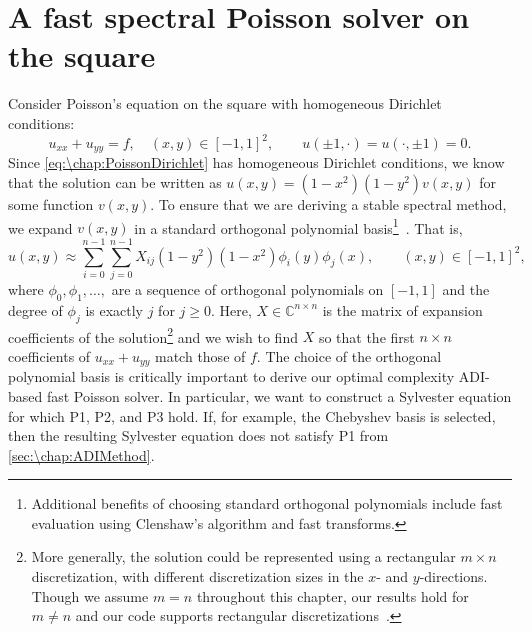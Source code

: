 \section{A fast spectral Poisson solver on the square}\label{sec:\chap:PoissonSquare}
Consider Poisson's equa\-tion on the square with homogeneous Dirichlet conditions:
\begin{equation}
u_{xx} + u_{yy} = f, \quad (x,y)\in[-1,1]^2, \qquad u(\pm1,\cdot) = u(\cdot,\pm 1) = 0.
\label{eq:\chap:PoissonDirichlet}
\end{equation}
Since \cref{eq:\chap:PoissonDirichlet} has homogeneous Dirichlet conditions, we know that the solution can be written as $u(x,y) = (1-x^2)(1-y^2)v(x,y)$ for some function $v(x,y)$. To ensure that we are deriving a stable spectral method, we expand $v(x,y)$ in a standard orthogonal polynomial basis\footnote{Additional benefits of choosing standard orthogonal polynomials include fast evaluation using Clenshaw's algorithm and fast transforms.}~\cite{Trefethen_00_01}. That is,
\begin{equation}
u(x,y) \approx \sum_{i=0}^{n-1} \sum_{j=0}^{n-1} X_{ij} (1-y^2)(1-x^2)\phi_i(y)\phi_j(x), \qquad (x,y)\in[-1,1]^2,
\label{eq:\chap:UltrasphericalExpansion} 
\end{equation} 
where $\phi_0,\phi_1,\ldots,$ are a sequence of orthogonal polynomials on $[-1,1]$ and the degree of $\phi_j$ is exactly $j$ for $j\geq 0$. Here, $X\in\mathbb{C}^{n\times n}$ is the matrix of expansion coefficients of the solution\footnote{More generally, the solution could be represented using a rectangular $m \times n$ discretization, with different discretization sizes in the $x$- and $y$-directions. Though we assume $m = n$ throughout this chapter, our results hold for $m \neq n$ and our code supports rectangular discretizations~\cite{GithubRepoPoisson}.} and we wish to find $X$ so that the first $n\times n$ coefficients of $u_{xx}+u_{yy}$ match those of $f$. 
The choice of the orthogonal polynomial basis is critically important to derive our optimal complexity ADI-based fast Poisson solver. In particular, we want to construct a Sylvester equation 
for which P1, P2, and P3 hold. If, for example, the Chebyshev basis is selected, then the resulting Sylvester equation does not satisfy P1 from \cref{sec:\chap:ADIMethod}.

